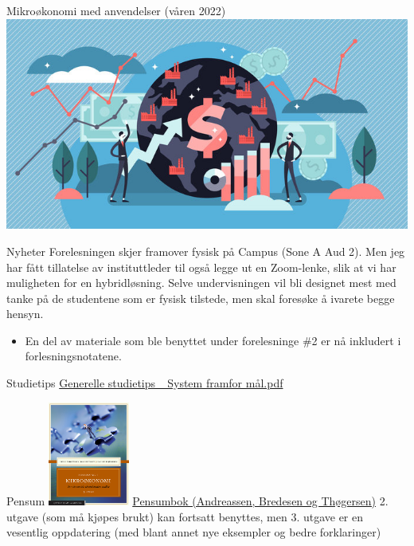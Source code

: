 \documentclass[
  ignorenonframetext,
]{beamer}
\author{}
\date{\vspace{-2.5em}}
\providecommand{\tightlist}{%
  \setlength{\itemsep}{0pt}\setlength{\parskip}{0pt}}
\begin{document}
\begin{frame}
\end{frame}

\begin{frame}{Mikroøkonomi med anvendelser (våren 2022)}
\protect\hypertarget{mikrouxf8konomi-med-anvendelser-vuxe5ren-2022}{}
\includegraphics{man/figures/abc.jpg}

\begin{block}{Nyheter}
\protect\hypertarget{nyheter}{}
Forelesningen skjer framover fysisk på Campus (Sone A Aud 2). Men jeg
har fått tillatelse av instituttleder til også legge ut en Zoom-lenke,
slik at vi har muligheten for en hybridløsning. Selve undervisningen vil
bli designet mest med tanke på de studentene som er fysisk tilstede, men
skal foresøke å ivarete begge hensyn.

\begin{itemize}
\tightlist
\item
  En del av materiale som ble benyttet under forelesninge \#2 er nå
  inkludert i forlesningsnotatene.
\end{itemize}
\end{block}

\begin{block}{Studietips}
\protect\hypertarget{studietips}{}
\href{https://github.com/joernih/SFB10816Mikrooekonomi/blob/main/inst/systemvsmaal.pdf}{Generelle
studietips\_ System framfor mål.pdf}
\end{block}

\begin{block}{Pensum}
\protect\hypertarget{pensum}{}
\includegraphics[width=0.2\textwidth,height=\textheight]{man/figures/pensum.jpg}
\href{https://www.cappelendammundervisning.no/_innforing-i-mikrookonomi-9788202640521}{Pensumbok
(Andreassen, Bredesen og Thøgersen)} 2. utgave (som må kjøpes brukt) kan
fortsatt benyttes, men 3. utgave er en vesentlig oppdatering (med blant
annet nye eksempler og bedre forklaringer)


\end{block}
\end{frame}
\end{document}
